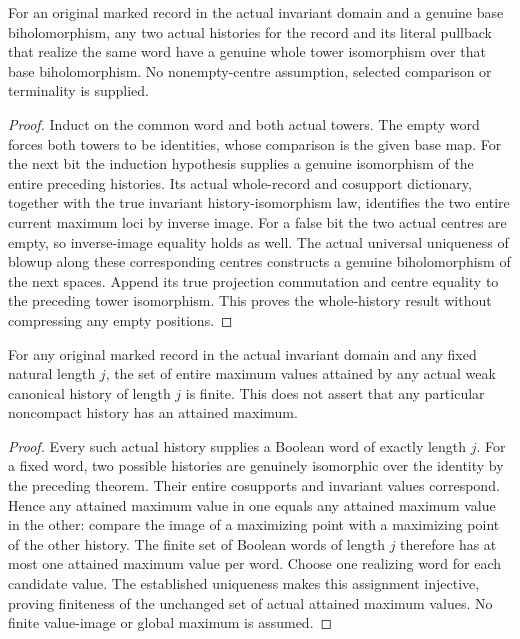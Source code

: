 \begin{theorem}
\label{hir:canonical-word-history-whole-uniqueness}
\leanok
For an original marked record in the actual invariant domain and a
genuine base biholomorphism, any two actual histories for the record
and its literal pullback that realize the same word have a genuine
whole tower isomorphism over that base biholomorphism. No nonempty-centre
assumption, selected comparison or terminality is supplied.
\end{theorem}
\begin{proof}
Induct on the common word and both actual towers. The empty word forces
both towers to be identities, whose comparison is the given base map.
For the next bit the induction hypothesis supplies a genuine isomorphism
of the entire preceding histories. Its actual whole-record and cosupport
dictionary, together with the true invariant history-isomorphism law,
identifies the two entire current maximum loci by inverse image. For
a false bit the two actual centres are empty, so inverse-image equality
holds as well. The actual universal uniqueness of blowup along these
corresponding centres constructs a genuine biholomorphism of the next
spaces. Append its true projection commutation and centre equality to
the preceding tower isomorphism. This proves the whole-history result
without compressing any empty positions.
\end{proof}

\begin{theorem}
\label{hir:canonical-word-finite-attained-maxima}
\leanok
For any original marked record in the actual invariant domain and any
fixed natural length $j$, the set of entire maximum values attained by
any actual weak canonical history of length $j$ is finite. This does
not assert that any particular noncompact history has an attained maximum.
\end{theorem}
\begin{proof}
Every such actual history supplies a Boolean word of exactly length
$j$. For a fixed word, two possible histories are genuinely isomorphic
over the identity by the preceding theorem. Their entire cosupports
and invariant values correspond. Hence any attained maximum value in
one equals any attained maximum value in the other: compare the image
of a maximizing point with a maximizing point of the other history.
The finite set of Boolean words of length $j$ therefore has at most
one attained maximum value per word. Choose one realizing word for
each candidate value. The established uniqueness makes this assignment
injective, proving finiteness of the unchanged set of actual attained
maximum values. No finite value-image or global maximum is assumed.
\end{proof}
